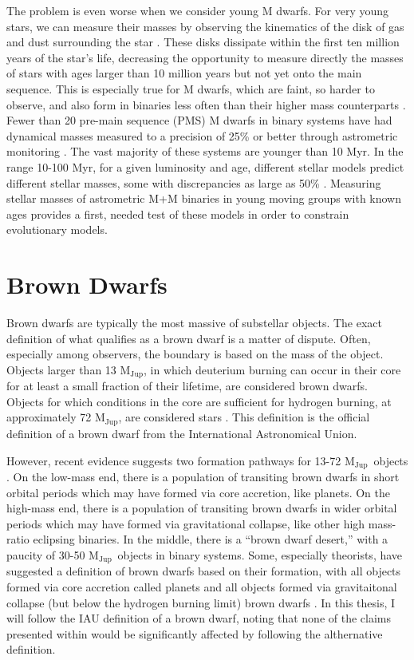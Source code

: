 \documentclass[12pt]{caltech_thesis}
\newcommand{\mjup}{{M$_\textrm{Jup}$}}
\begin{document}
The problem is even worse when we consider young M dwarfs.
For very young stars, we can measure their masses by observing the kinematics of
the disk of gas and dust surrounding the star \citep{Czekala15, Czekala16}.
These disks dissipate within the first ten million years of the star's life, decreasing the opportunity to measure directly the masses of stars with ages larger than 10 million years but not yet onto the main sequence. 
This is especially true for M dwarfs, which are faint, so harder to observe, and also 
form in binaries less often than their higher mass counterparts \citep{Fischer92, Shan15}.
Fewer than 20 pre-main sequence (PMS) M dwarfs in binary systems have had dynamical masses measured to a
precision of 25\% or better through astrometric monitoring \citep{Dupuy14}.
The vast majority of these systems are younger than 10 Myr.
In the range 10-100 Myr, for a given luminosity and age, different stellar models predict different stellar masses, some with discrepancies as large as 50\% \citep{Hillenbrand04,Schlieder14}.
Measuring stellar masses of astrometric M+M binaries in young moving groups with known 
ages provides a first, needed test of these models in order to constrain evolutionary models.

\section{Brown Dwarfs}
Brown dwarfs are typically the most massive of substellar objects. 
The exact definition of what qualifies as a brown dwarf is a matter of dispute.
Often, especially among observers, the boundary is based on the mass of the object.
Objects larger than 13 \mjup, in which deuterium burning can occur in their core for
at least a small fraction of their lifetime, are considered brown dwarfs.
Objects for which conditions in the core are sufficient for hydrogen burning, at approximately 
72 \mjup, are considered stars \citep{Zuckerman00}.
This definition is the official definition of a brown dwarf from the International
Astronomical Union.

However, recent evidence suggests two formation pathways for 13-72 \mjup\ objects
\citep{Bayliss16}. 
On the low-mass end, there is a population of transiting brown dwarfs in short orbital
periods which may have formed via core accretion, like planets.
On the high-mass end, there is a population of transiting brown dwarfs in wider orbital
periods which may have formed via gravitational collapse, like other high mass-ratio
eclipsing binaries.
In the middle, there is a ``brown dwarf desert,'' with a paucity of 30-50 \mjup\ objects in
binary systems.
Some, especially theorists, have suggested a definition of brown dwarfs based on their
formation, with all objects formed via core accretion called planets and all objects
formed via gravitaitonal collapse (but below the hydrogen burning limit) brown dwarfs
\citep[e.g.][]{Chabrier14}.
In this thesis, I will follow the IAU definition of a brown dwarf, noting that none of the
claims presented within would be significantly affected by following the althernative
definition.
\end{document}
